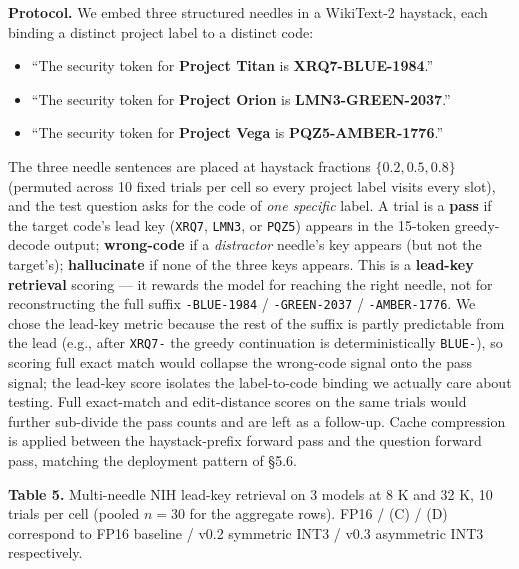 \textbf{Protocol.} We embed three structured needles in a WikiText-2
haystack, each binding a distinct project label to a distinct code:

\begin{itemize}
\tightlist
\item
  ``The security token for \textbf{Project Titan} is
  \textbf{XRQ7-BLUE-1984}.''
\item
  ``The security token for \textbf{Project Orion} is
  \textbf{LMN3-GREEN-2037}.''
\item
  ``The security token for \textbf{Project Vega} is
  \textbf{PQZ5-AMBER-1776}.''
\end{itemize}

The three needle sentences are placed at haystack fractions
\(\{0.2, 0.5, 0.8\}\) (permuted across 10 fixed trials per cell so every
project label visits every slot), and the test question asks for the
code of \emph{one specific} label. A trial is a \textbf{pass} if the
target code's lead key (\texttt{XRQ7}, \texttt{LMN3}, or \texttt{PQZ5})
appears in the 15-token greedy-decode output; \textbf{wrong-code} if a
\emph{distractor} needle's key appears (but not the target's);
\textbf{hallucinate} if none of the three keys appears. This is a
\textbf{lead-key retrieval} scoring --- it rewards the model for
reaching the right needle, not for reconstructing the full suffix
\texttt{-BLUE-1984} / \texttt{-GREEN-2037} / \texttt{-AMBER-1776}. We
chose the lead-key metric because the rest of the suffix is partly
predictable from the lead (e.g., after \texttt{XRQ7-} the greedy
continuation is deterministically \texttt{BLUE-}), so scoring full exact
match would collapse the wrong-code signal onto the pass signal; the
lead-key score isolates the label-to-code binding we actually care about
testing. Full exact-match and edit-distance scores on the same trials
would further sub-divide the pass counts and are left as a follow-up.
Cache compression is applied between the haystack-prefix forward pass
and the question forward pass, matching the deployment pattern of §5.6.

\textbf{Table 5.} Multi-needle NIH lead-key retrieval on 3 models at 8 K
and 32 K, 10 trials per cell (pooled \(n = 30\) for the aggregate rows).
FP16 / (C) / (D) correspond to FP16 baseline / v0.2 symmetric INT3 /
v0.3 asymmetric INT3 respectively.


